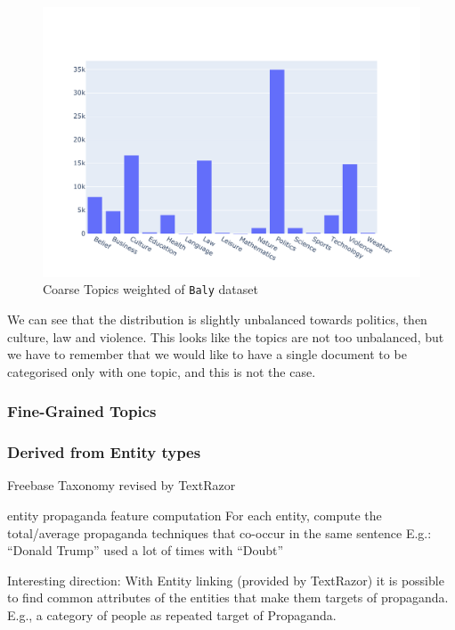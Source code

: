 \begin{figure}[!htbp]
    \centering
    \includegraphics[width=\linewidth]{figures/baly_coarse_weighted.pdf}
    \caption{Coarse Topics weighted of \texttt{Baly} dataset}
    \label{fig:baly_coarse_weighted}
\end{figure}

We can see that the distribution is slightly unbalanced towards politics, then culture, law and violence. This looks like the topics are not too unbalanced, but we have to remember that we would like to have a single document to be categorised only with one topic, and this is not the case.

\subsubsection{Fine-Grained Topics}

\subsubsection{Derived from Entity types}

Freebase Taxonomy revised by TextRazor

entity propaganda feature computation
For each entity, compute the total/average propaganda techniques that co-occur in the same sentence %
E.g.: “Donald Trump” used a lot of times with “Doubt” %

Interesting direction:
With Entity linking (provided by TextRazor) it is possible to find common attributes of the entities that make them targets of %
propaganda. E.g., a category of people as repeated target of Propaganda.


